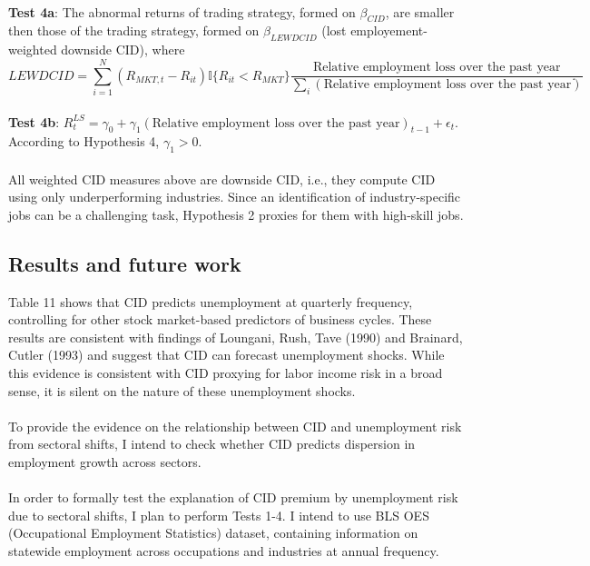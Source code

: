 \documentclass[12pt]{article}
\begin{document}
\paragraph{}
\textbf{Test 4a}: The abnormal returns of trading strategy, formed on $\beta_{CID}$, are smaller then those of the trading strategy, formed on $\beta_{LEWDCID}$ (lost employement-weighted downside CID), where $$LEWDCID = \sum^{N}_{i=1}{(R_{MKT,t}-R_{it}) \mathbb{I}\{R_{it}<R_{MKT}\} \frac{\text{Relative employment loss over the past year}}{\sum_{i} (\text{Relative employment loss over the past year}) }}.$$
\\ \-\hspace{0.3cm}
\textbf{Test 4b}: $R^{LS}_{t} = \gamma_0 +\gamma_1 (\text{Relative employment loss over the past year})_{t-1} +\epsilon_t$. \\ 
According to Hypothesis 4, $\gamma_1>0$.
\paragraph{}
All weighted CID measures above are downside CID, i.e., they compute CID using only underperforming industries. Since an identification of industry-specific jobs can be a challenging task, Hypothesis 2 proxies for them with high-skill jobs. 

\subsection{Results and future work}

Table 11 shows that CID predicts unemployment at quarterly frequency, controlling for other stock market-based predictors of business cycles. These results are consistent with findings of Loungani, Rush, Tave (1990) and Brainard, Cutler (1993) and suggest that CID can forecast unemployment shocks. While this evidence is consistent with CID proxying for labor income risk in a broad sense, it is silent on the nature of these unemployment shocks.
\paragraph{}
To provide the evidence on the relationship between CID and unemployment risk from sectoral shifts, I intend to check whether CID predicts dispersion in employment growth across sectors.
\paragraph{}
In order to formally test the explanation of CID premium by unemployment risk due to sectoral shifts, I plan to perform Tests 1-4. I intend to use BLS OES (Occupational Employment Statistics) dataset, containing information on statewide employment across occupations and industries at annual frequency. 
\end{document}
